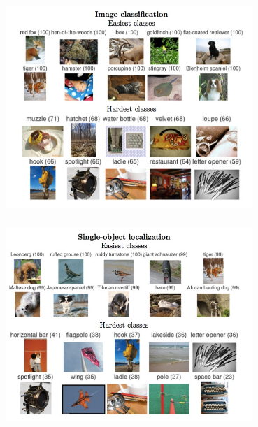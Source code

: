 \documentclass[xetex,mathserif,serif,aspectratio=169]{beamer}
\begin{document}
\begin{frame}[fragile] \frametitle{} \oldB \small

\begin{center}
\includegraphics[width=0.7\textwidth]{img/ilsvrcDifficultClasses.jpg}
\end{center}

\end{frame}


\begin{frame}[fragile] \frametitle{} \oldB \small

\begin{center}
\includegraphics[width=0.7\textwidth]{img/ilsvrcDifficultLocalization.jpg}
\end{center}

\end{frame}
\end{document}
